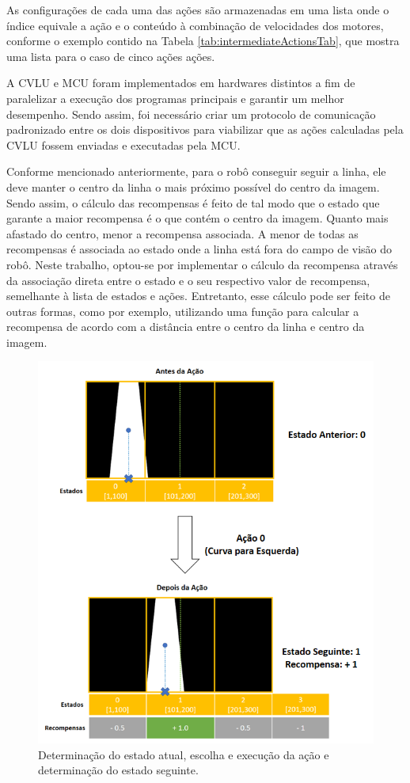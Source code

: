 \documentclass[a4paper]{ifacconf}
\begin{document}
As configurações de cada uma das ações são armazenadas em uma lista onde o índice equivale a ação e o conteúdo à combinação de velocidades dos motores, conforme o exemplo contido na Tabela \ref{tab:intermediateActionsTab}, que mostra uma lista para o caso de cinco ações ações.

A CVLU e MCU foram implementados em hardwares distintos a fim de paralelizar a execução dos programas principais e garantir um melhor desempenho. Sendo assim, foi necessário criar um protocolo de comunicação padronizado entre os dois dispositivos para viabilizar que as ações calculadas pela CVLU fossem enviadas e executadas pela MCU.

Conforme mencionado anteriormente, para o robô conseguir seguir a linha, ele deve manter o centro da linha o mais próximo possível do centro da imagem. Sendo assim, o cálculo das recompensas é feito de tal modo que o estado que garante a maior recompensa é o que contém o centro da imagem. Quanto mais afastado do centro, menor a recompensa associada. A menor de todas as recompensas é associada ao estado onde a linha está fora do campo de visão do robô. Neste trabalho, optou-se por implementar o cálculo da recompensa através da associação direta entre o estado e o seu respectivo valor de recompensa, semelhante à lista de estados e ações. Entretanto, esse cálculo pode ser feito de outras formas, como por exemplo, utilizando uma função para calcular a recompensa de acordo com a distância entre o centro da linha e centro da imagem.

\begin{figure}
\centering  
\includegraphics[scale=0.55]{Figuras/statesAndRewards.png}
\caption{Determinação do estado atual, escolha e execução da ação e determinação do estado seguinte.}
\label{fig:statesAndRewards}
\end{figure} 
\end{document}
